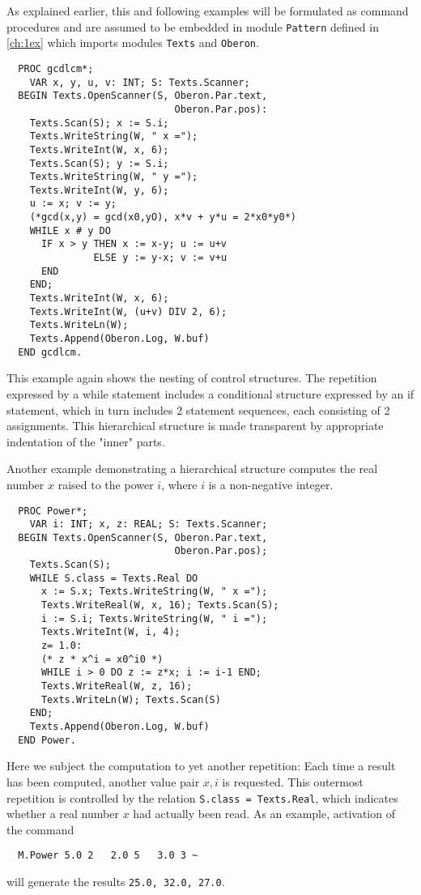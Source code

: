 As explained earlier, this and following examples will be formulated as command procedures and
are assumed to be embedded in module \verb|Pattern| defined in \ref{ch:1ex} which imports
modules \verb|Texts| and \verb|Oberon|.
\begin{verbatim}
  PROC gcdlcm*;
    VAR x, y, u, v: INT; S: Texts.Scanner;
  BEGIN Texts.OpenScanner(S, Oberon.Par.text,
                             Oberon.Par.pos):
    Texts.Scan(S); x := S.i;
    Texts.WriteString(W, " x =");
    Texts.WriteInt(W, x, 6);
    Texts.Scan(S); y := S.i;
    Texts.WriteString(W, " y =");
    Texts.WriteInt(W, y, 6);
    u := x; v := y;
    (*gcd(x,y) = gcd(x0,yO), x*v + y*u = 2*x0*y0*)
    WHILE x # y DO
      IF x > y THEN x := x-y; u := u+v
               ELSE y := y-x; v := v+u
      END
    END;
    Texts.WriteInt(W, x, 6);
    Texts.WriteInt(W, (u+v) DIV 2, 6);
    Texts.WriteLn(W);
    Texts.Append(Oberon.Log, W.buf)
  END gcdlcm.
\end{verbatim}
This example again shows the nesting of control structures. The repetition expressed by a while
statement includes a conditional structure expressed by an if statement, which in turn includes
2 statement sequences, each consisting of 2 assignments. This hierarchical structure is made
transparent by appropriate indentation of the "inner" parts.

Another example demonstrating a hierarchical structure computes the real number $x$ raised to
the power $i$, where $i$ is a non-negative integer.
\begin{verbatim}
  PROC Power*;
    VAR i: INT; x, z: REAL; S: Texts.Scanner;
  BEGIN Texts.OpenScanner(S, Oberon.Par.text,
                             Oberon.Par.pos);
    Texts.Scan(S);
    WHILE S.class = Texts.Real DO
      x := S.x; Texts.WriteString(W, " x =");
      Texts.WriteReal(W, x, 16); Texts.Scan(S);
      i := S.i; Texts.WriteString(W, " i =");
      Texts.WriteInt(W, i, 4);
      z= 1.0:
      (* z * x^i = x0^i0 *)
      WHILE i > 0 DO z := z*x; i := i-1 END;
      Texts.WriteReal(W, z, 16);
      Texts.WriteLn(W); Texts.Scan(S)
    END;
    Texts.Append(Oberon.Log, W.buf)
  END Power.
\end{verbatim}
Here we subject the computation to yet another repetition: Each time a result has been computed,
another value pair $x, i$ is requested. This outermost repetition is controlled by the relation
\verb|S.class = Texts.Real|, which indicates whether a real number $x$ had actually been read.
As an example, activation of the command
\begin{verbatim}
  M.Power 5.0 2   2.0 5   3.0 3 ~
\end{verbatim}
will generate the results \verb|25.0, 32.0, 27.0|.

